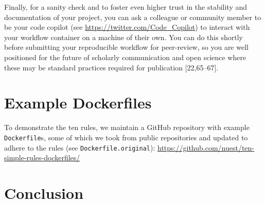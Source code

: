 \documentclass[10pt,letterpaper]{article}
\begin{document}
Finally, for a sanity check and to foster even higher trust in the
stability and documentation of your project, you can ask a colleague or
community member to be your code copilot (see
\url{https://twitter.com/Code_Copilot}) to interact with your workflow
container on a machine of their own. You can do this shortly before
submitting your reproducible workflow for peer-review, so you are well
positioned for the future of scholarly communication and open science
where these may be standard practices required for publication
{[}22,65--67{]}.

\hypertarget{example-dockerfiles}{%
\section{Example Dockerfiles}\label{example-dockerfiles}}

To demonstrate the ten rules, we maintain a GitHub repository with
example \texttt{Dockerfile}s, some of which we took from public
repositories and updated to adhere to the rules (see
\texttt{Dockerfile.original}):
\url{https://github.com/nuest/ten-simple-rules-dockerfiles/}

\hypertarget{conclusion}{%
\section*{Conclusion}\label{conclusion}}
\end{document}
